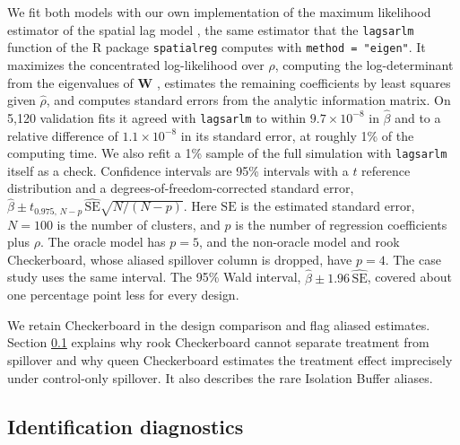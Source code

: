 \documentclass[11pt]{article}
\begin{document}
We fit both models with our own implementation of the maximum likelihood
estimator of the spatial lag model \citep{bivand_comparing_2015}, the
same estimator that the \texttt{lagsarlm} function of the R package
\texttt{spatialreg} computes with \texttt{method\ =\ "eigen"}. It
maximizes the concentrated log-likelihood over \(\rho\), computing the
log-determinant from the eigenvalues of \(\mathbf{W}\)
\citep{ord_estimation_1975}, estimates the remaining coefficients by
least squares given \(\hat\rho\), and computes standard errors from the
analytic information matrix. On 5,120 validation fits it agreed with
\texttt{lagsarlm} to within \(9.7\times10^{-8}\) in \(\hat\beta\) and to
a relative difference of \(1.1\times10^{-8}\) in its standard error, at
roughly 1\% of the computing time. We also refit a 1\% sample of the
full simulation with \texttt{lagsarlm} itself as a check. Confidence intervals are 95\% intervals with a $t$ reference distribution and a degrees-of-freedom-corrected standard error, $\hat\beta \pm t_{0.975,\,N-p}\,\widehat{\text{SE}}\sqrt{N/(N-p)}$. Here $\widehat{\text{SE}}$ is the estimated standard error, $N = 100$ is the number of clusters, and $p$ is the number of regression coefficients plus $\rho$. The oracle model has $p = 5$, and the non-oracle model and rook Checkerboard, whose aliased spillover column is dropped, have $p = 4$. The case study uses the same interval. The 95\% Wald interval, $\hat\beta \pm 1.96\,\widehat{\text{SE}}$, covered about one percentage point less for every design.

We retain Checkerboard in the design comparison and flag aliased estimates.
Section \ref{identification-diagnostics} explains why rook Checkerboard
cannot separate treatment from spillover and why queen Checkerboard
estimates the treatment effect imprecisely under control-only spillover.
It also describes the rare Isolation Buffer aliases.


\subsection{Identification diagnostics}\label{identification-diagnostics}
\end{document}
